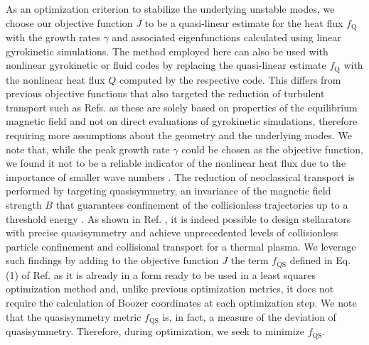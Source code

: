 \documentclass[prl,twocolumn,amsmath,amssymb,showpacs,superscriptaddress]{revtex4-2}
\begin{document}
As an optimization criterion to stabilize the underlying unstable modes, we choose our objective function $J$ to be a quasi-linear estimate \cite{Jenko2005,Fable2009} for the heat flux $f_\text{Q}$ with the growth rates $\gamma$ and associated eigenfunctions calculated using linear gyrokinetic simulations.
%
The method employed here can also be used with nonlinear gyrokinetic or fluid codes by replacing the quasi-linear estimate $f_{\text{Q}}$ with the nonlinear heat flux $Q$ computed by the respective code.
%
This differs from previous objective functions that also targeted the reduction of turbulent transport such as Refs. \cite{Mynick2010,Proll2015b,Roberg-Clark2022} as these are solely based on properties of the equilibrium magnetic field {and not on direct evaluations of gyrokinetic simulations}, therefore requiring more assumptions about the geometry and the underlying modes.
%
We note that, while the peak growth rate $\gamma$ could be chosen as the objective function, we found it not to be a reliable indicator of the nonlinear heat flux due to the importance of smaller wave numbers \cite{Pueschel2016}.
%
The reduction of neoclassical transport is performed by targeting quasisymmetry, an invariance of the magnetic field strength $B$ that guarantees confinement of the collisionless trajectories up to a threshold energy \cite{Nuhrenberg1988a}.
%
As shown in Ref. \cite{Landreman2022}, it is indeed possible to design stellarators with precise quasisymmetry and achieve unprecedented levels of collisionless particle confinement and collisional transport for a thermal plasma.
%
We leverage such findings by adding to the objective function $J$ the term $f_{\text{QS}}$ defined in Eq. (1) of Ref. \cite{Landreman2022} as it is already in a form ready to be used in a least squares optimization method and, unlike previous optimization metrics, it does not require the calculation of Boozer coordinates \cite{Boozer1981} at each optimization step.
%
{We note that the quasisymmetry metric $f_{\text{QS}}$ is, in fact, a measure of the deviation of quasisymmetry. Therefore, during optimization, we seek to minimize $f_{\text{QS}}$.}

\end{document}
